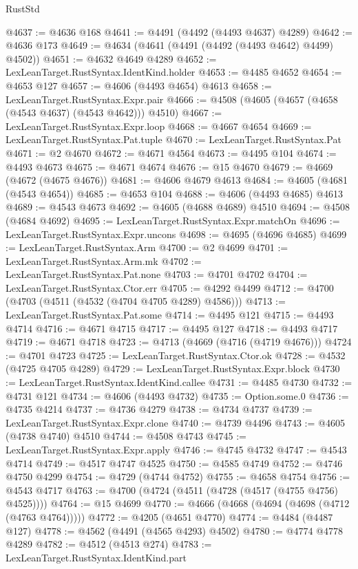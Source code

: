 \begin{lexlean}{RustStd}
\begin{coremodule}
@4637 := @4636 @168
@4641 := @4491 (@4492 (@4493 @4637) @4289)
@4642 := @4636 @173
@4649 := @4634 (@4641 (@4491 (@4492 (@4493 @4642) @4499) @4502))
@4651 := @4632 @4649 @4289
@4652 := LexLeanTarget.RustSyntax.IdentKind.holder
@4653 := @4485 @4652
@4654 := @4653 @127
@4657 := @4606 (@4493 @4654) @4613
@4658 := LexLeanTarget.RustSyntax.Expr.pair
@4666 := @4508 (@4605 (@4657 (@4658 (@4543 @4637) (@4543 @4642))) @4510)
@4667 := LexLeanTarget.RustSyntax.Expr.loop
@4668 := @4667 @4654
@4669 := LexLeanTarget.RustSyntax.Pat.tuple
@4670 := LexLeanTarget.RustSyntax.Pat
@4671 := @2 @4670
@4672 := @4671 @4564
@4673 := @4495 @104
@4674 := @4493 @4673
@4675 := @4671 @4674
@4676 := @15 @4670
@4679 := @4669 (@4672 (@4675 @4676))
@4681 := @4606 @4679 @4613
@4684 := @4605 (@4681 (@4543 @4654))
@4685 := @4653 @104
@4688 := @4606 (@4493 @4685) @4613
@4689 := @4543 @4673
@4692 := @4605 (@4688 @4689) @4510
@4694 := @4508 (@4684 @4692)
@4695 := LexLeanTarget.RustSyntax.Expr.matchOn
@4696 := LexLeanTarget.RustSyntax.Expr.uncons
@4698 := @4695 (@4696 @4685)
@4699 := LexLeanTarget.RustSyntax.Arm
@4700 := @2 @4699
@4701 := LexLeanTarget.RustSyntax.Arm.mk
@4702 := LexLeanTarget.RustSyntax.Pat.none
@4703 := @4701 @4702
@4704 := LexLeanTarget.RustSyntax.Ctor.err
@4705 := @4292 @4499
@4712 := @4700 (@4703 (@4511 (@4532 (@4704 @4705 @4289) @4586)))
@4713 := LexLeanTarget.RustSyntax.Pat.some
@4714 := @4495 @121
@4715 := @4493 @4714
@4716 := @4671 @4715
@4717 := @4495 @127
@4718 := @4493 @4717
@4719 := @4671 @4718
@4723 := @4713 (@4669 (@4716 (@4719 @4676)))
@4724 := @4701 @4723
@4725 := LexLeanTarget.RustSyntax.Ctor.ok
@4728 := @4532 (@4725 @4705 @4289)
@4729 := LexLeanTarget.RustSyntax.Expr.block
@4730 := LexLeanTarget.RustSyntax.IdentKind.callee
@4731 := @4485 @4730
@4732 := @4731 @121
@4734 := @4606 (@4493 @4732)
@4735 := Option.some.{0}
@4736 := @4735 @4214
@4737 := @4736 @4279
@4738 := @4734 @4737
@4739 := LexLeanTarget.RustSyntax.Expr.clone
@4740 := @4739 @4496
@4743 := @4605 (@4738 @4740) @4510
@4744 := @4508 @4743
@4745 := LexLeanTarget.RustSyntax.Expr.apply
@4746 := @4745 @4732
@4747 := @4543 @4714
@4749 := @4517 @4747 @4525
@4750 := @4585 @4749
@4752 := @4746 @4750 @4299
@4754 := @4729 (@4744 @4752)
@4755 := @4658 @4754
@4756 := @4543 @4717
@4763 := @4700 (@4724 (@4511 (@4728 (@4517 (@4755 @4756) @4525))))
@4764 := @15 @4699
@4770 := @4666 (@4668 (@4694 (@4698 (@4712 (@4763 @4764)))))
@4772 := @4205 (@4651 @4770)
@4774 := @4484 (@4487 @127)
@4778 := @4562 (@4491 (@4565 @4293) @4502)
@4780 := @4774 @4778 @4289
@4782 := @4512 (@4513 @274)
@4783 := LexLeanTarget.RustSyntax.IdentKind.part

\end{coremodule}
\end{lexlean}
